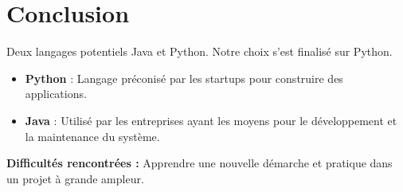 	\section{Conclusion}
	\begin{frame}
		Deux langages potentiels Java et Python. Notre choix s'est finalisé sur Python.
		\begin{itemize}
		\item \textbf{Python} : Langage préconisé par les startups pour construire des applications. 
		\item \textbf{Java} : Utilisé par les entreprises ayant les moyens pour le développement et la maintenance du système.
		\end{itemize}
		
		\textbf{Difficultés rencontrées :}  Apprendre une nouvelle démarche et pratique dans un projet à grande ampleur.\\
		
		
	\end{frame}
	

